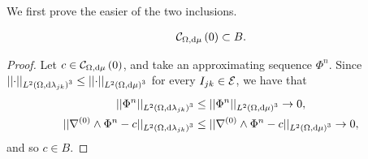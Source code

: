 We first prove the easier of the two inclusions.
\begin{lemma} \label{lem:CurlZeroInB}
	\begin{align*}
		\mathcal{C}_{ \Omega, \mathrm{d}\mu}\left( 0 \right)\subset B.
	\end{align*}
\end{lemma}
\begin{proof}
	Let $c\in\mathcal{C}_{ \Omega, \mathrm{d}\mu}\left( 0 \right)$, and take an approximating sequence $\Phi^n$.
	Since $\lvert\lvert  \cdot  \rvert\rvert_{L^{2}\left( \Omega,\mathrm{d}\lambda_{jk} \right)^3} \leq \lvert\lvert  \cdot  \rvert\rvert_{L^{2}\left( \Omega,\mathrm{d}\mu \right)^3}$ for every $I_{jk}\in\mathcal{E}$, we have that
	\begin{align*}
		\lvert\lvert  \Phi^n  \rvert\rvert_{L^{2}\left( \Omega,\mathrm{d}\lambda_{jk} \right)^3} &\leq \lvert\lvert  \Phi^n  \rvert\rvert_{L^{2}\left( \Omega,\mathrm{d}\mu \right)^3} \rightarrow 0, \\
		\lvert\lvert  \nabla^{(0)}\wedge\Phi^n - c  \rvert\rvert_{L^{2}\left( \Omega,\mathrm{d}\lambda_{jk} \right)^3} & \leq \lvert\lvert  \nabla^{(0)}\wedge\Phi^n - c  \rvert\rvert_{L^{2}\left( \Omega,\mathrm{d}\mu \right)^3} \rightarrow 0,
	\end{align*}
	and so $c\in B$.
\end{proof}

